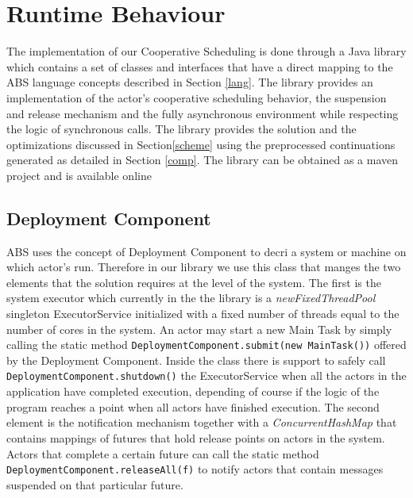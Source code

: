\section{Runtime Behaviour}
\label{run}
The implementation of our Cooperative Scheduling is done through a Java library which contains a set of classes and interfaces that have a direct mapping to the ABS language concepts described in Section \ref{lang}. The library provides an implementation of the actor's cooperative scheduling behavior, the suspension and release mechanism and the fully asynchronous environment while respecting the logic of synchronous calls. The library provides the solution and the optimizations discussed in Section\ref{scheme} using the preprocessed continuations generated as detailed in Section \ref{comp}. The library can be obtained as a maven project and is available online\cite{library}

\subsection{Deployment Component}
ABS uses the concept of Deployment Component to decri a system or machine on which actor's run. Therefore in our library we use this class that manges the two elements that the solution requires at the level of the system. The first is the system executor which currently in the the library is a \textit{newFixedThreadPool} singleton ExecutorService initialized with a fixed number of threads equal to the number of cores in the system. An actor may start a new Main Task by simply calling the static method \lstinline|DeploymentComponent.submit(new MainTask())| offered by the Deployment Component. Inside the class there is support to safely call \lstinline|DeploymentComponent.shutdown()| the ExecutorService when all the actors in the application have completed execution, depending of course if the logic of the program reaches a point when all actors have finished execution. The second element is the notification mechanism together with a \textit{ConcurrentHashMap} that contains mappings of futures that hold release points on actors in the system. Actors that complete a certain future can call the static method \lstinline|DeploymentComponent.releaseAll(f)| to notify actors that contain messages suspended on that particular future. 


